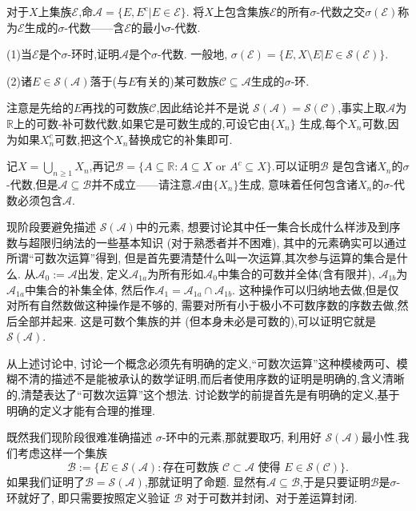 \begin{4}
对于$X$上集族$\mathcal{E}$,命$\mathcal{A} = \{ E, E^{\mathrm{c} }| E\in \mathcal{E} \}$.
将$X$上包含集族$\mathcal{E}$的所有$\sigma$-代数之交$\sigma(\mathcal{E})$称为$\mathcal{E}$生成的$\sigma$-代数——含$\mathcal{E}$的最小$\sigma$-代数.

(1)当$\mathcal{E}$是个$\sigma$-环时,证明$\mathcal{A}$是个$\sigma$-代数. 
一般地, $\sigma(\mathcal{E})=\{E,X\setminus E|E\in\mathcal{S}(\mathcal{E})\}.$

(2)诸$E\in\mathcal{S}(\mathcal{A})$落于(与$E$有关的)某可数族$\mathcal C\subseteq\mathcal{A}$生成的$\sigma$-环.
\end{4}
\begin{hint}

注意是先给的$E$再找的可数族$\mathcal{C}$,因此结论并不是说 $\mathcal{S}(\mathcal{A})=\mathcal{S}(\mathcal{C})$,事实上取$\mathcal{A}$为$\mathbb{R}$上的可数-补可数代数,如果它是可数生成的,可设它由$\{X_n\}$ 生成,每个$X_n$可数,因为如果$X_n^c$可数,把这个$X_n$替换成它的补集即可.

记$X=\bigcup\limits_{n\geqslant1}X_n$,再记$\mathcal{B}=\{A\subseteq\mathbb{R}:A\subseteq X$ or $A^c\subseteq X\}.$可以证明$\mathcal{B}$ 是包含诸$X_n$的$\sigma$-代数,但是$\mathcal{A}\subseteq\mathcal{B}$并不成立——请注意$\mathcal{A}$由$\{X_n\}$生成, 意味着任何包含诸$X_n$的$\sigma$-代数必须包含$\mathcal{A}.$

现阶段要避免描述 $\mathcal{S}(\mathcal{A})$中的元素,
想要讨论其中任一集合长成什么样涉及到序数与超限归纳法的一些基本知识 (对于熟悉者并不困难),
其中的元素确实可以通过所谓“可数次运算”得到,
但是首先要清楚什么叫一次运算,其次参与运算的集合是什么.
从$\mathcal{A}_0:=\mathcal{A}$出发,
定义$\mathcal{A}_{1a}$为所有形如$\mathcal{A}_0$中集合的可数并全体(含有限并), 
$\mathcal{A}_{1b}$为$\mathcal{A}_{1a}$中集合的补集全体,
然后作$\mathcal{A}_1=\mathcal{A}_{1a}\cap\mathcal{A}_{1b}$.
这种操作可以归纳地去做,但是仅对所有自然数做这种操作是不够的,
需要对所有小于极小不可数序数的序数去做,然后全部并起来.
这是可数个集族的并 (但本身未必是可数的),可以证明它就是 $\mathcal{S}(\mathcal{A})$.

从上述讨论中, 讨论一个概念必须先有明确的定义,“可数次运算”这种模棱两可、模糊不清的描述不是能被承认的数学证明,而后者使用序数的证明是明确的,含义清晰的,清楚表达了“可数次运算”这个想法. 
讨论数学的前提首先是有明确的定义,基于明确的定义才能有合理的推理.
\end{hint}

\begin{solution}

既然我们现阶段很难准确描述 $\sigma$-环中的元素,那就要取巧,
利用好 $\mathcal{S}(\mathcal{A})$最小性.我们考虑这样一个集族
$$\mathcal{B}:=\{E\in\mathcal{S}(\mathcal{A}):\text{存在可数族 }\mathcal{C}\subset\mathcal{A}\text{ 使得 }E\in\mathcal{S}(\mathcal{C})\}.$$
如果我们证明了$\mathcal{B}=\mathcal{S}(\mathcal{A})$,那就证明了命题.
显然有$\mathcal{A}\subseteq\mathcal{B}$,于是只要证明$\mathcal{B}$是$\sigma$-环就好了,
即只需要按照定义验证 $\mathcal{B}$ 对于可数并封闭、对于差运算封闭.
\end{solution}


